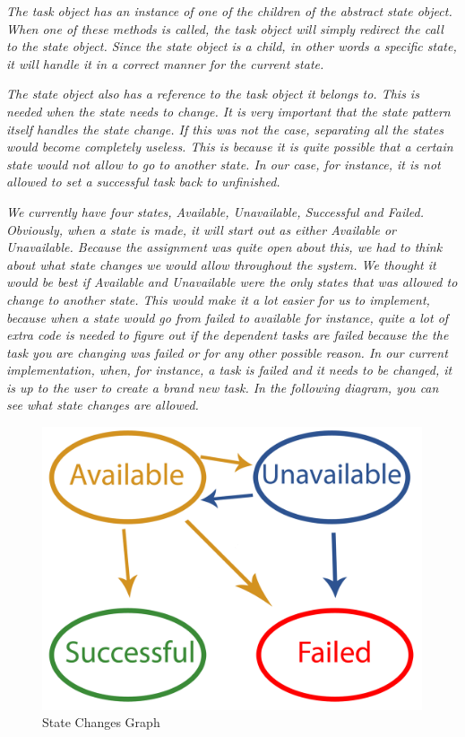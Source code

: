 				\emph{The task object has an instance of one of the children of the abstract state object. When one of these methods is called, the task object will simply redirect the call to the state object. Since the state object is a child, in other words a specific state, it will handle it in a correct manner for the current state.} 
			
				\emph{The state object also has a reference to the task object it belongs to. This is needed when the state needs to change. It is very important that the state pattern itself handles the state change. If this was not the case, separating all the states would become completely useless. This is because it is quite possible that a certain state would not allow to go to another state. In our case, for instance, it is not allowed to set a successful task back to unfinished.}
			
				\emph{We currently have four states, Available, Unavailable, Successful and Failed. Obviously, when a state is made, it will start out as either Available or Unavailable. Because the assignment was quite open about this, we had to think about what state changes we would allow throughout the system. We thought it would be best if Available and Unavailable were the only states that was allowed to change to another state. This would make it a lot easier for us to implement, because when a state would go from failed to available for instance, quite a lot of extra code is needed to figure out if the dependent tasks are failed because the the task you are changing was failed or for any other possible reason. In our current implementation, when, for instance, a task is failed and it needs to be changed, it is up to the user to create a brand new task. In the following diagram, you can see what state changes are allowed.}
				\begin{figure}[H]
					\begin{center}
						\includegraphics[scale=0.7]{images/StateChanges.png}
					\end{center}
					\caption{State Changes Graph}
				\end{figure}
			
